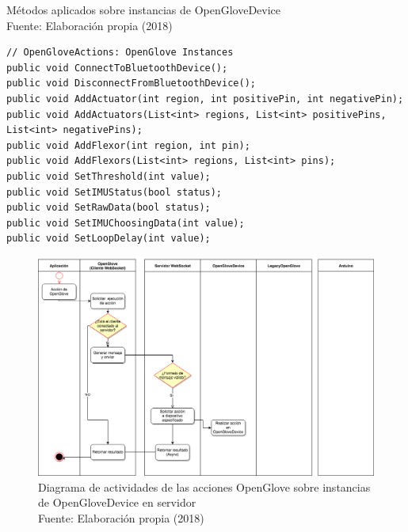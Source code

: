 \begin{algorithm}[!ht]
  \begin{center} 
   	\captionsetup{justification=centering}
    \caption[Métodos aplicados sobre instancias de OpenGloveDevice]{Métodos aplicados sobre instancias de OpenGloveDevice\\ \tab[4cm] Fuente: Elaboración propia (2018)}
    \label{fig:methods-2-openglove-device}
  \end{center}
  \begin{lstlisting}
// OpenGloveActions: OpenGlove Instances
public void ConnectToBluetoothDevice();
public void DisconnectFromBluetoothDevice();
public void AddActuator(int region, int positivePin, int negativePin);
public void AddActuators(List<int> regions, List<int> positivePins, List<int> negativePins);
public void AddFlexor(int region, int pin);
public void AddFlexors(List<int> regions, List<int> pins);
public void SetThreshold(int value);
public void SetIMUStatus(bool status);
public void SetRawData(bool status);
public void SetIMUChoosingData(int value);
public void SetLoopDelay(int value);
\end{lstlisting}
\end{algorithm}

\begin{figure}[H]
  \begin{center} 
   	\includegraphics[width=1.0\textwidth]{images/chapter04/ActivityDiagrams-OpenGloveActions-2.png} 
   	\captionsetup{justification=centering}
    \caption[Diagrama de actividades de las acciones OpenGlove sobre instancias de OpenGloveDevice en servidor]{Diagrama de actividades de las acciones OpenGlove sobre instancias de OpenGloveDevice en servidor\\Fuente: Elaboración propia (2018)}
    \label{fig:activity-diagrams-2-openglove-device}
  \end{center}
\end{figure}



